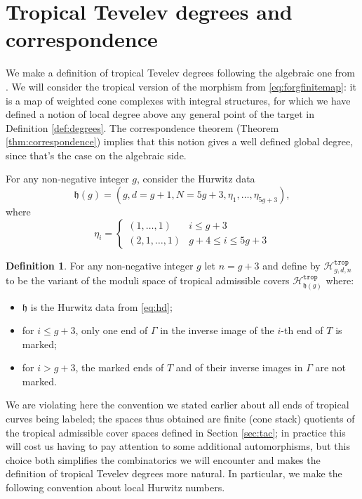 \documentclass[11pt,reqno]{amsart}
\theoremstyle{definition}
\newtheorem{definition}[theorem]{Definition}
\newcommand{\ecolor}[1]{{\color{WildStrawberry} #1}}
\newcommand\trop{{\mathtt{trop}}}
\newcommand\Hur[1]{\mathcal H_{#1}}
\begin{document}
\section{Tropical Tevelev degrees and correspondence}

\label{sec:troptd}


We make a definition of tropical Tevelev degrees following  the algebraic one from \cite{CPS:Tevdeg}. We will consider the tropical version of the morphism from \eqref{eq:forgfinitemap}: it is a map of weighted cone complexes with integral structures, for which we have defined a notion of local degree above any general point of the target in Definition \ref{def:degrees}. The correspondence theorem (Theorem \ref{thm:correspondence}) implies that this notion gives a well defined global degree, since that's the case on the algebraic side.


For any non-negative integer $g$, consider the Hurwitz data \begin{equation}\label{eq:hd}\mathfrak{h}(g) = (g, d = g+1, N = 5g+3, \eta_1, \ldots, \eta_{5g+3}),\end{equation} where 
\begin{equation}
    \eta_i = 
    \left\{
    \begin{array}{cl}
        (1, \ldots, 1) &  i\leq g+3\\
        (2, 1, \ldots, 1)  &   g+4 \leq i \leq 5g+3
    \end{array}
    \right.
\end{equation}


\begin{definition} \label{admtrop}
    For any non-negative integer $g$ let $n = g+3$ and 
    define by $\Hur{g,d,n}^\trop$ to be the variant of the moduli space of tropical admissible covers $\Hur{\mathfrak{h}(g)}^\trop$ where: 
    \begin{itemize}
    \item $\mathfrak{h}$ is the Hurwitz data from \eqref{eq:hd};
        \item for $i\leq g+3$,  only one end of $\Gamma$ in the inverse image of the $i$-th end of $T$ is marked; 
        \item for $i>g+3$, the  marked ends of $T$ 
 and of their inverse images in $\Gamma$ are not marked. %
    \end{itemize}
    \end{definition}
We are violating here the convention we stated earlier about all ends of tropical curves being labeled; the spaces thus obtained are finite (cone stack) quotients of the tropical admissible cover spaces defined in Section \ref{sec:tac}; in practice this will cost us having to pay  attention to some additional automorphisms, but this choice both simplifies the combinatorics we will encounter and makes the definition of tropical Tevelev degrees more natural. In particular, we make the following convention about local Hurwitz numbers.
\end{document}

